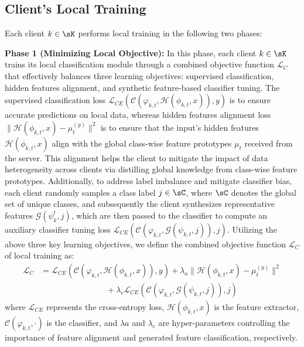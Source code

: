 \documentclass[lettersize,journal]{IEEEtran}
\begin{document}
\subsection{Client's Local Training}
Each client $k\in\sK$ performs local training in the following two phases:

\noindent\textbf{Phase 1 (Minimizing Local Objective):} In this phase, each client $k\in \sK$ trains its local classification module through a combined objective function $\mathcal{L}_{C}$ that effectively balances three learning objectives: supervised classification, hidden features alignment, and synthetic feature-based classifier tuning. The supervised classification loss $\mathcal{L}_{CE} (\mathcal{C}(\varphi_{k,t}, \mathcal{H}(\phi_{k,t}, x)), y)$ is to ensure accurate predictions on local data, whereas hidden features alignment loss $\| \mathcal{H}(\phi_{k,t}, x) - \mu_t^{(y)} \|^2$ is to ensure that the input's hidden features $\mathcal{H}(\phi_{k,t}, x)$ align with the global class-wise feature prototypes $\mu_t$ received from the server. This alignment helps the client to mitigate the impact of data heterogeneity across clients via distilling global knowledge from class-wise feature prototypes. Additionally, to address label imbalance and mitigate classifier bias, each client randomly samples a class label \(j \in \sC\), where \(\sC\) denotes the global set of unique classes, and subsequently the client synthesizes representative features \(\mathcal{G}(\psi_k^t, j)\), which are then passed to the classifier to compute an auxiliary classifier tuning loss $\mathcal{L}_{CE} (\mathcal{C}(\varphi_{k,t}, \mathcal{G}(\psi_{k,t}, j)), j)$. Utilizing the above three key learning objectives, we define the combined objective function $\mathcal{L}_{C}$ of local training as:
\begin{align}
\label{eq:combined_objective}
\mathcal{L}_{C} &= \mathcal{L}_{CE} (\mathcal{C}(\varphi_{k,t}, \mathcal{H}(\phi_{k,t}, x)), y) + \lambda_{a} \| \mathcal{H}(\phi_{k,t}, x) - \mu_t^{(y)} \|^2 \\ \nonumber
& \quad \quad \quad \quad \quad \quad\quad \quad + \lambda_{c}\mathcal{L}_{CE} (\mathcal{C}(\varphi_{k,t}, \mathcal{G}(\psi_{k,t}, j)), j)
\end{align}
where $\mathcal{L}_{CE}$ represents the cross-entropy loss, $\mathcal{H}(\phi_{k,t}, x)$ is the feature extractor, $\mathcal{C}(\varphi_{k,t}, \cdot)$ is the classifier, and $\lambda{a}$ and $\lambda_{c}$ are hyper-parameters controlling the importance of feature alignment and generated feature classification, respectively.
\end{document}
